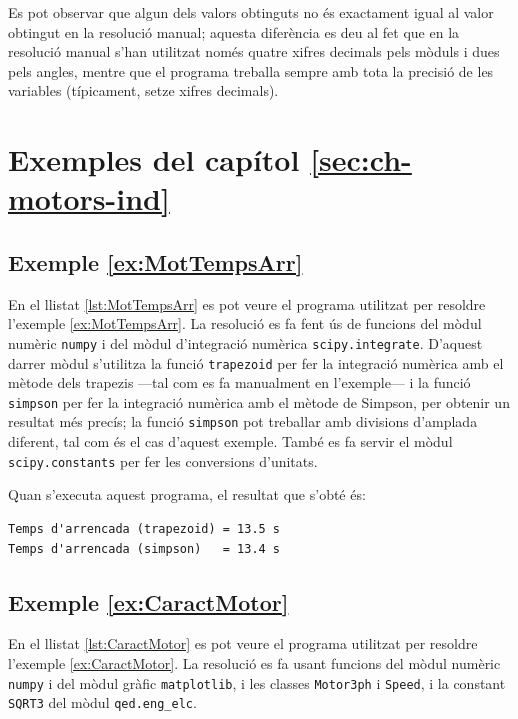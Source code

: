 Es pot observar que algun dels valors obtinguts no és exactament igual al valor obtingut en la resolució manual; aquesta diferència es deu  al fet que en la resolució manual s'han utilitzat només quatre xifres decimals pels mòduls i dues pels angles, mentre que el programa treballa sempre amb tota la precisió de les variables (típicament, setze xifres decimals).




\section{Exemples del capítol \ref*{sec:ch-motors-ind}}

\hypertarget{exemple:MotTempsArr}{\subsection{Exemple \ref*{ex:MotTempsArr} \MotTempsArr}}
En el llistat \vref{lst:MotTempsArr} es pot veure el programa utilitzat per resoldre l'exemple \vref{ex:MotTempsArr}. La resolució es fa fent ús de funcions del mòdul numèric \texttt{numpy} i del mòdul d'integració numèrica \texttt{scipy.integrate}. D'aquest darrer mòdul s'utilitza la funció \texttt{trapezoid} per fer la integració numèrica amb el mètode dels trapezis ---tal com es fa manualment en l'exemple--- i la funció \texttt{simpson} per fer la integració numèrica amb el mètode de Simpson, per obtenir un resultat més precís; la funció \texttt{simpson} pot treballar amb divisions d'amplada diferent, tal com és el cas d'aquest exemple. També es fa servir el mòdul \texttt{scipy.constants} per fer les conversions d'unitats.


Quan s'executa aquest programa, el resultat que s'obté és:
\lstset{
	language=,
	numbers=none,
	frame=none
}
\begin{lstlisting}
Temps d'arrencada (trapezoid) = 13.5 s
Temps d'arrencada (simpson)   = 13.4 s
\end{lstlisting} 


\hypertarget{exemple:CaractMotor}{\subsection{Exemple \ref*{ex:CaractMotor} \CaractMotor}}
En el llistat \vref{lst:CaractMotor} es pot veure el programa utilitzat per resoldre l'exemple \vref{ex:CaractMotor}. La resolució es fa usant funcions del mòdul numèric \texttt{numpy} i del mòdul gràfic \texttt{matplotlib}, i les classes \texttt{Motor3ph} i \texttt{Speed}, i la constant  \texttt{SQRT3} del mòdul \texttt{qed.eng\_elc}.


